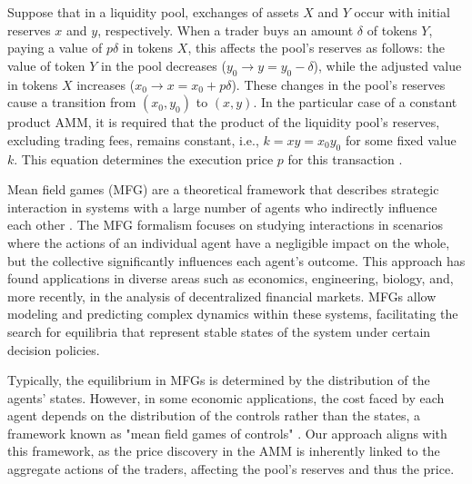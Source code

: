 \documentclass[11pt]{article}
\theoremstyle{definition}
\begin{document}
Suppose that in a liquidity pool, exchanges of assets $X$ and $Y$ occur with initial reserves $x$ and $y$, respectively. When a trader buys an amount $\delta$ of tokens $Y$, paying a value of $p\delta$ in tokens $X$, this affects the pool's reserves as follows: the value of token $Y$ in the pool decreases ($y_0 \to y = y_0 - \delta$), while the adjusted value in tokens $X$ increases ($x_0 \to x = x_0 + p\delta$). These changes in the pool's reserves cause a transition from $(x_0, y_0)$ to $(x, y)$. In the particular case of a constant product AMM, it is required that the product of the liquidity pool's reserves, excluding trading fees, remains constant, i.e., $k = xy = x_0y_0$ for some fixed value $k$. This equation determines the execution price $p$ for this transaction \citep{angeris2019analysis,mohan2021amm,xu2022SoK}.

Mean field games (MFG) are a theoretical framework that describes strategic interaction in systems with a large number of agents who indirectly influence each other \citep{guanxing2023MFL,gueant2011applications,lachapelle2011congestion}. The MFG formalism focuses on studying interactions in scenarios where the actions of an individual agent have a negligible impact on the whole, but the collective significantly influences each agent's outcome. This approach has found applications in diverse areas such as economics, engineering, biology, and, more recently, in the analysis of decentralized financial markets. MFGs allow modeling and predicting complex dynamics within these systems, facilitating the search for equilibria that represent stable states of the system under certain decision policies.

Typically, the equilibrium in MFGs is determined by the distribution of the agents' states. However, in some economic applications, the cost faced by each agent depends on the distribution of the controls rather than the states, a framework known as "mean field games of controls" \citep{gomes2016extendedmfg, gomes2014solutionextendedmfg, graber2020variational}. Our approach aligns with this framework, as the price discovery in the AMM is inherently linked to the aggregate actions of the traders, affecting the pool's reserves and thus the price.
\end{document}
